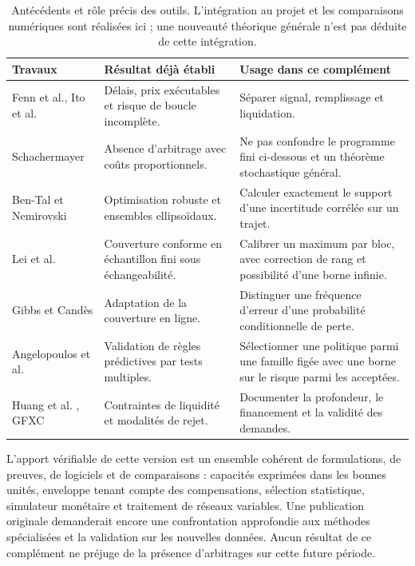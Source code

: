 \begin{table}[H]\centering\small
\begin{tabularx}{\linewidth}{@{}p{42mm}YY@{}}
\toprule
Travaux & Résultat déjà établi & Usage dans ce complément\\
\midrule
Fenn et al., Ito et al. \cite{fenn,ito} & Délais, prix exécutables et risque de boucle incomplète. & Séparer signal, remplissage et liquidation.\\
Schachermayer \cite{schachermayer} & Absence d'arbitrage avec coûts proportionnels. & Ne pas confondre le programme fini ci-dessous et un théorème stochastique général.\\
Ben-Tal et Nemirovski \cite{ext-robust} & Optimisation robuste et ensembles ellipsoïdaux. & Calculer exactement le support d'une incertitude corrélée sur un trajet.\\
Lei et al. \cite{ext-lei} & Couverture conforme en échantillon fini sous échangeabilité. & Calibrer un maximum par bloc, avec correction de rang et possibilité d'une borne infinie.\\
Gibbs et Candès \cite{ext-aci,ext-aci-new} & Adaptation de la couverture en ligne. & Distinguer une fréquence d'erreur d'une probabilité conditionnelle de perte.\\
Angelopoulos et al. \cite{ext-ltt} & Validation de règles prédictives par tests multiples. & Sélectionner une politique parmi une famille figée avec une borne sur le risque parmi les acceptées.\\
Huang et al. \cite{ext-liquidity}, GFXC \cite{ext-lastlook} & Contraintes de liquidité et modalités de rejet. & Documenter la profondeur, le financement et la validité des demandes.\\
\bottomrule
\end{tabularx}
\caption{Antécédents et rôle précis des outils. L'intégration au projet et les comparaisons numériques sont réalisées ici ; une nouveauté théorique générale n'est pas déduite de cette intégration.}
\end{table}

L'apport vérifiable de cette version est un ensemble cohérent de formulations, de preuves, de logiciels et de comparaisons : capacités exprimées dans les bonnes unités, enveloppe tenant compte des compensations, sélection statistique, simulateur monétaire et traitement de réseaux variables. Une publication originale demanderait encore une confrontation approfondie aux méthodes spécialisées et la validation sur les nouvelles données. Aucun résultat de ce complément ne préjuge de la présence d'arbitrages sur cette future période.

